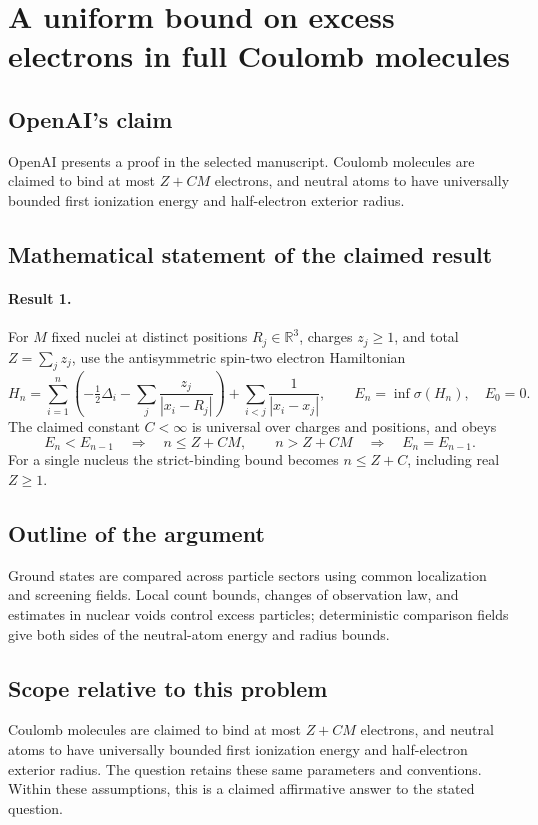 \documentclass[11pt]{article}
\begin{document}
\section*{A uniform bound on excess electrons in full Coulomb molecules}

\subsection{OpenAI's claim}
OpenAI presents a proof in the selected manuscript. Coulomb molecules are claimed to bind at most $Z+CM$ electrons, and neutral atoms to have universally bounded first ionization energy and half-electron exterior radius.

\subsection{Mathematical statement of the claimed result}
\paragraph{Result 1.} For \(M\) fixed nuclei at distinct positions \(R_j\in\mathbb R^3\), charges \(z_j\ge1\), and total \(Z=\sum_jz_j\), use the antisymmetric spin-two electron Hamiltonian
\[
 H_n=\sum_{i=1}^n\left(-\tfrac12\Delta_i-\sum_j\frac{z_j}{|x_i-R_j|}\right)
 +\sum_{i<j}\frac1{|x_i-x_j|},\qquad E_n=\inf\sigma(H_n),\quad E_0=0.
\]
The claimed constant \(C<\infty\) is universal over charges and positions, and obeys
\[
 E_n<E_{n-1}\quad\Longrightarrow\quad n\le Z+CM,
 \qquad n>Z+CM\quad\Longrightarrow\quad E_n=E_{n-1}.
\]
For a single nucleus the strict-binding bound becomes \(n\le Z+C\), including real \(Z\ge1\).

\subsection{Outline of the argument}
Ground states are compared across particle sectors using common localization and screening fields. Local count bounds, changes of observation law, and estimates in nuclear voids control excess particles; deterministic comparison fields give both sides of the neutral-atom energy and radius bounds.

\subsection{Scope relative to this problem}
Coulomb molecules are claimed to bind at most $Z+CM$ electrons, and neutral atoms to have universally bounded first ionization energy and half-electron exterior radius. The question retains these same parameters and conventions. Within these assumptions, this is a claimed affirmative answer to the stated question.
\end{document}

